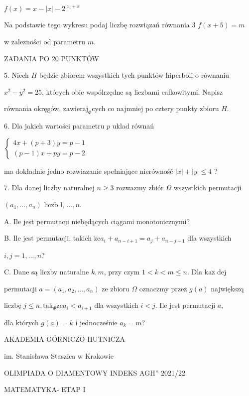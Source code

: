\documentclass[a4paper,12pt]{article}
\begin{document}
$f(x)=x-|x|-2^{|x|+x}$

Na podstawie tego wykresu podaj liczbę rozwiązań równania 3 $f(x+5)=m$

w zalezności od parametru $m.$

ZADANIA PO 20 PUNKTÓW

5. Niech $H$ będzie zbiorem wszystkich tych punktów hiperboli o równaniu

$x^{2}-y^{2} = 25$, których obie wspólrzędne są liczbami cafkowitymi. Napisz

równania okręgów, $\mathrm{z}\mathrm{a}\mathrm{w}\mathrm{i}\mathrm{e}\mathrm{r}\mathrm{a}\mathrm{j}_{\Phi}$cych co najmniej po cztery punkty zbioru $H.$

6. Dla jakich wartości parametru $p$ uklad równań

$\left\{\begin{array}{l}
4x+(p+3)y=p-1\\
(p-1)x+py=p-2.
\end{array}\right.$

ma dokładnie jedno rozwiazanie spełniające nierównośč $|x|+|y|\leq 4$ ?

7. Dla danej liczby naturalnej $n\geq 3$ rozwazmy zbiór $\Omega$ wszystkich permutacji

$(a_{1},\ldots,a_{n})$ liczb l, $\ldots, n.$

A. Ile jest permutacji niebędących ciągami monotonicznymi?

B. Ile jest permutacji, takich $\dot{\mathrm{z}}\mathrm{e}a_{i}+a_{n-i+1} =a_{j}+a_{n-j+1}$ dla wszystkich

$i, j=1, \ldots, n$?

C. Dane są liczby naturalne $k, m$, przy czym $1 <k<m\leq n$. Dla $\mathrm{k}\mathrm{a}\dot{\mathrm{z}}$ dej

permutacji $a=(a_{1},a_{2},\ldots,a_{n})$ ze zbioru $\Omega$ oznaczmy przez $g(a)$ największq

liczbę $j\leq n, \mathrm{t}\mathrm{a}\mathrm{k}_{\Phi}\dot{\mathrm{z}}\mathrm{e}a_{i}<a_{i+1}$ dla wszystkich $i<j$. Ile jest permutacji $a,$

dla których $g(a)=k$ i jednocześnie $a_{k}=m$?






AKADEMIA GÓRNICZO-HUTNICZA

im. Stanisława Staszica w Krakowie

OLIMPIADA O DIAMENTOWY INDEKS AGH'' 2021/22

MATEMATYKA- ETAP I
\end{document}
